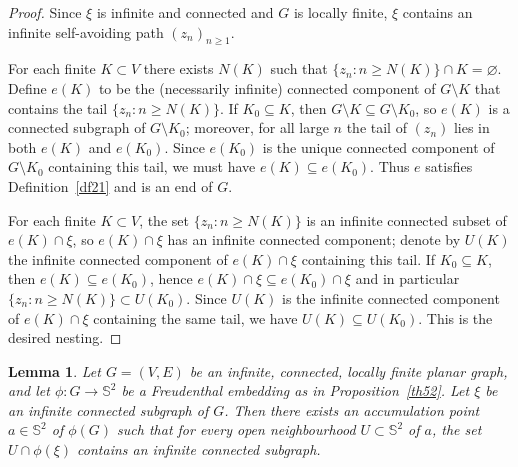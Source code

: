 \documentclass[11pt]{amsart}
\theoremstyle{plain}
\newtheorem{lemma}[theorem]{Lemma}
\numberwithin{equation}{section}
\numberwithin{figure}{section}
\begin{document}
\begin{proof}
Since $\xi$ is infinite and connected and $G$ is locally finite, $\xi$
contains an infinite self-avoiding path $(z_n)_{n\ge1}$.

For each finite $K\subset V$ there exists $N(K)$ such that
$\{z_n:n\ge N(K)\}\cap K=\varnothing$. Define $e(K)$ to be the (necessarily
infinite) connected component of $G\setminus K$ that contains the tail
$\{z_n:n\ge N(K)\}$. If $K_0\subseteq K$, then $G\setminus K\subseteq G\setminus K_0$,
so $e(K)$ is a connected subgraph of $G\setminus K_0$; moreover, for all large
$n$ the tail of $(z_n)$ lies in both $e(K)$ and $e(K_0)$. Since $e(K_0)$ is the
unique connected component of $G\setminus K_0$ containing this tail, we must
have $e(K)\subseteq e(K_0)$. Thus $e$ satisfies Definition~\ref{df21} and is
an end of $G$.

For each finite $K\subset V$, the set $\{z_n:n\ge N(K)\}$ is an infinite
connected subset of $e(K)\cap\xi$, so $e(K)\cap\xi$ has an infinite connected
component; denote by $U(K)$ the infinite connected component of $e(K)\cap\xi$
containing this tail. If $K_0\subseteq K$, then $e(K)\subseteq e(K_0)$, hence
$e(K)\cap\xi\subseteq e(K_0)\cap\xi$ and in particular
$\{z_n:n\ge N(K)\}\subset U(K_0)$. Since $U(K)$ is the infinite connected
component of $e(K)\cap\xi$ containing the same tail, we have
$U(K)\subseteq U(K_0)$. This is the desired nesting.
\end{proof}






\begin{lemma}\label{lm27}
Let $G=(V,E)$ be an infinite, connected, locally finite planar graph, and let
$\phi:G\to\mathbb{S}^2$ be a Freudenthal embedding as in
Proposition~\ref{th52}. Let $\xi$ be an infinite connected subgraph of $G$.
Then there exists an accumulation point $a\in\mathbb{S}^2$ of $\phi(G)$ such
that for every open neighbourhood $U\subset\mathbb{S}^2$ of $a$, the set
$U\cap\phi(\xi)$ contains an infinite connected subgraph.
\end{lemma}
\end{document}

